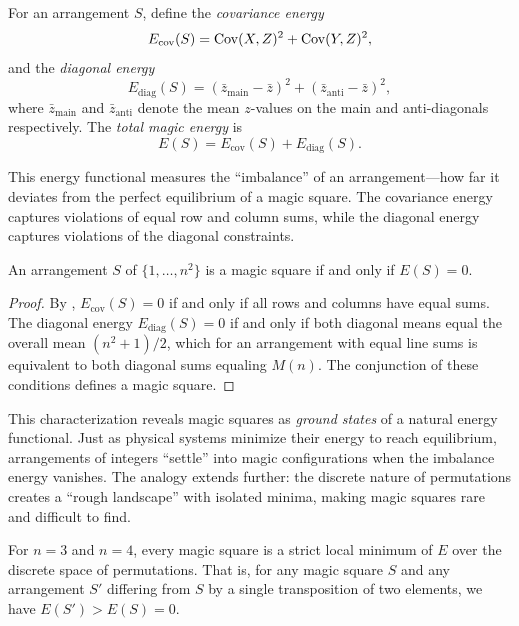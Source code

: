 \begin{definition}
\label{def:covariance_energy}
For an arrangement $S$, define the \emph{covariance energy}
\[
E_{\text{cov}}(S) = \mathrm{Cov}(X, Z)^2 + \mathrm{Cov}(Y, Z)^2,
\]
and the \emph{diagonal energy}
\[
E_{\text{diag}}(S) = \left( \bar{z}_{\text{main}} - \bar{z} \right)^2 + \left( \bar{z}_{\text{anti}} - \bar{z} \right)^2,
\]
where $\bar{z}_{\text{main}}$ and $\bar{z}_{\text{anti}}$ denote the mean $z$-values 
on the main and anti-diagonals respectively.
The \emph{total magic energy} is
\[
E(S) = E_{\text{cov}}(S) + E_{\text{diag}}(S).
\]
\end{definition}

This energy functional measures the ``imbalance'' of an arrangement---how far it deviates 
from the perfect equilibrium of a magic square.
The covariance energy captures violations of equal row and column sums,
while the diagonal energy captures violations of the diagonal constraints.

\begin{theorem}
\label{thm:energy_char}
An arrangement $S$ of $\{1, \ldots, n^2\}$ is a magic square if and only if $E(S) = 0$.
\end{theorem}

\begin{proof}
By , $E_{\text{cov}}(S) = 0$ if and only if all rows and columns 
have equal sums.
The diagonal energy $E_{\text{diag}}(S) = 0$ if and only if both diagonal means equal 
the overall mean $(n^2+1)/2$, which for an arrangement with equal line sums 
is equivalent to both diagonal sums equaling $M(n)$.
The conjunction of these conditions defines a magic square.
\end{proof}

This characterization reveals magic squares as \emph{ground states} of a natural energy functional.
Just as physical systems minimize their energy to reach equilibrium,
arrangements of integers ``settle'' into magic configurations when the imbalance energy vanishes.
The analogy extends further: the discrete nature of permutations creates a ``rough landscape'' 
with isolated minima, making magic squares rare and difficult to find.

\begin{proposition}
\label{prop:isolation}
For $n = 3$ and $n = 4$, every magic square is a strict local minimum of $E$ 
over the discrete space of permutations.
That is, for any magic square $S$ and any arrangement $S'$ differing from $S$ 
by a single transposition of two elements, we have $E(S') > E(S) = 0$.
\end{proposition}

